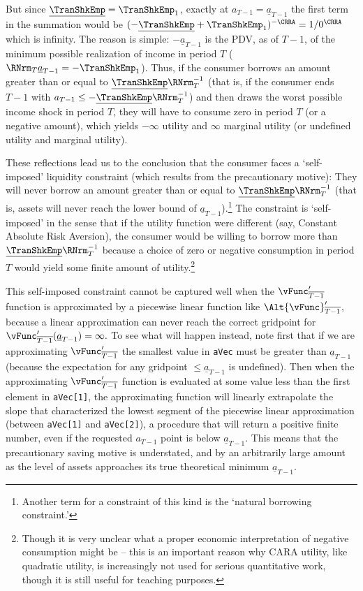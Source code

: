 \documentclass[titlepage, headings=optiontotocandhead]{\econtex}
\begin{document}
\providecommand{\TranShkEmpMin}{}\renewcommand{\TranShkEmpMin}{\underline{\TranShkEmp}}
But since $\TranShkEmpMin=\TranShkEmp_{1}$, exactly at
${a}_{T-1}=\underline{a}_{T-1}$ the first term in the summation would
be $(-\TranShkEmpMin+\TranShkEmp_{1})^{-\CRRA}=1/0^{\CRRA}$ which is
infinity.  The reason is simple: $-\underline{a}_{T-1}$ is
the PDV, as of $T-1$, of the minimum possible realization of income in
period $T$ ($\RNrm_{T}\underline{a}_{T-1} = -\TranShkEmp_{1}$).  Thus,
if the consumer borrows an amount greater than or equal to
$\underline{\TranShkEmp}\RNrm_{T}^{-1}$ (that is, if the consumer ends
$T-1$ with ${a}_{T-1} \leq -\underline{\TranShkEmp}\RNrm_{T}^{-1}$) and
then draws the worst possible income shock in period $T$, they will have
to consume zero in period $T$ (or a negative amount), which yields
$-\infty$ utility and $\infty$ marginal utility (or undefined utility
and marginal utility).

These reflections lead us to the conclusion that the consumer faces a
`self-imposed' liquidity constraint (which results from the
precautionary motive): They will never borrow an amount greater
than or equal to $\underline{\TranShkEmp}\RNrm_{T}^{-1}$ (that is,
assets will never reach the lower bound of
$\underline{a}_{T-1}$).\footnote{Another term for a constraint of this
  kind is the `natural borrowing constraint.'}  The constraint is
`self-imposed' in the sense that if the utility function were
different (say, Constant Absolute Risk Aversion), the consumer would
be willing to borrow more than $\underline{\TranShkEmp}\RNrm_{T}^{-1}$
because a choice of zero or negative consumption in period $T$ would
yield some finite amount of utility.\footnote{Though it is very unclear what a
  proper economic interpretation of negative consumption might be --
  this is an important reason why CARA utility, like quadratic utility,
  is increasingly not used for serious quantitative work, though it is
  still useful for teaching purposes.}

This self-imposed constraint cannot be captured well when the
$\vFunc^{\prime}_{\overline{T-1}}$ function is approximated by a piecewise
linear function like $\Alt{\vFunc}^{\prime}_{\overline{T-1}}$, because a
linear approximation can never reach the correct gridpoint for
$\vFunc^{\prime}_{\overline{T-1}}(\underline{a}_{T-1})=\infty.$ To see what
will happen instead, note first that if we are approximating $\vFunc^{\prime}_{\overline{T-1}}$ the smallest value in
\texttt{aVec} must be greater than $\underline{a}_{T-1}$
(because the expectation for any gridpoint $\leq \underline{a}_{T-1}$ is undefined).  Then when the
approximating $\vFunc^{\prime}_{\overline{T-1}}$ function is evaluated at
some value less than the first element in \texttt{aVec[1]}, the
approximating function will linearly extrapolate the slope that
characterized the lowest segment of the piecewise linear approximation
(between \texttt{aVec[1]} and \texttt{aVec[2]}), a
procedure that will return a positive finite number, even if the
requested ${a}_{T-1}$ point is below $\underline{a}_{T-1}$.  This means that the
precautionary saving motive is understated, and by an arbitrarily
large amount as the level of assets approaches its true theoretical
minimum $\underline{a}_{T-1}$.
\end{document}
